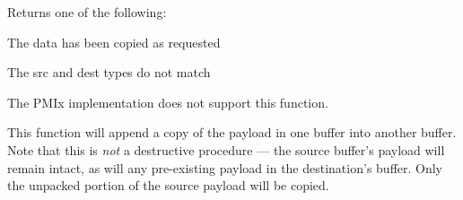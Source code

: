 \begin{arglist}
\end{arglist}

Returns one of the following:
\begin{constantdesc}
\item {} The data has been copied as requested
\item {} The src and dest  types do not match
\item {} The \ac{PMIx} implementation does not support this function.
\end{constantdesc}

\descr

This function will append a copy of the payload in one buffer into another buffer. Note that this is \textit{not} a destructive procedure --- the source buffer's payload will remain intact, as will any pre-existing payload in the destination's buffer. Only the unpacked portion of the source payload will be copied.


